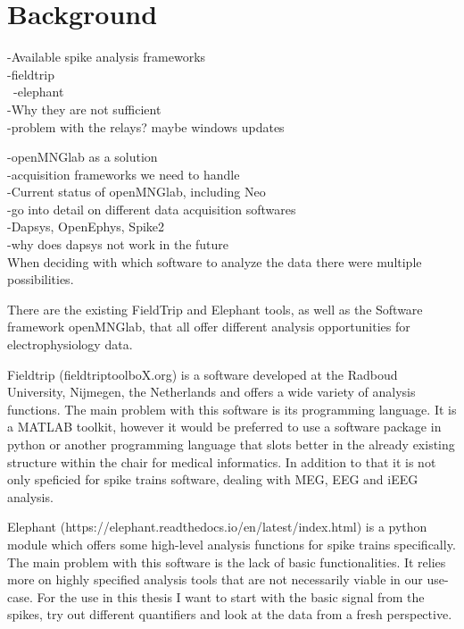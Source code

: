 \chapter{Background}

-Available spike analysis frameworks \\
-fieldtrip \\\
-elephant \\
-Why they are not sufficient \\
-problem with the relays? maybe windows updates 

 

-openMNGlab as a solution \\
-acquisition frameworks we need to handle \\
-Current status of openMNGlab, including Neo \\
-go into detail on different data acquisition softwares \\
-Dapsys, OpenEphys, Spike2 \\
-why does dapsys not work in the future \\

  

When deciding with which software to analyze the data there were multiple possibilities. 

There are the existing FieldTrip and Elephant tools, as well as the Software framework openMNGlab,  that all offer different analysis opportunities for electrophysiology data. 

Fieldtrip (fieldtriptoolboX.org) is a software developed at the Radboud University, Nijmegen, the Netherlands and offers a wide variety of analysis functions. The main problem with this software is its programming language. It is a MATLAB toolkit, however it would be preferred to use a software package in python or another programming language that slots better in the already existing structure within the chair for medical informatics. In addition to that it is not only speficied for spike trains software, dealing with MEG, EEG and iEEG analysis. 

Elephant (https://elephant.readthedocs.io/en/latest/index.html) is a python module which offers some high-level analysis functions for spike trains specifically. The main problem with this software is the lack of basic functionalities. It relies more on highly specified analysis tools that are not necessarily viable in our use-case. For the use in this thesis I want to start with the basic signal from the spikes, try out different quantifiers and look at the data from a fresh perspective. 

